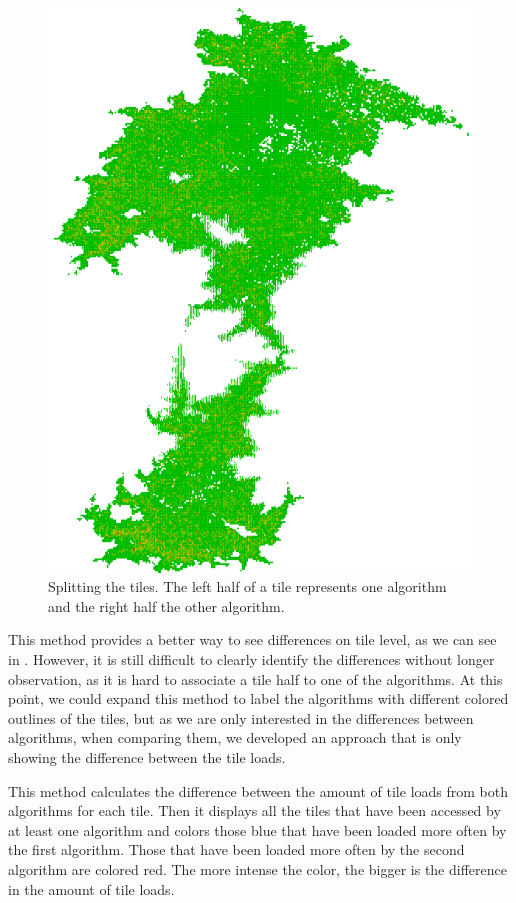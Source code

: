 \documentclass
[
    paper = a4,
    pagesize,
    12 pt,
    oneside,                       %
    open = right,
    DIV = calc,
    BCOR = 0 mm,                   %
    bibtotoc
]
{scrbook}
\begin{document}
\begin{figure}
    \includegraphics[width=\textwidth]{Images/vis-compare-splitted.png}
\caption[]{Splitting the tiles. The left half of a tile represents one algorithm and the right half the other algorithm.}
\label{fig:splitted_tiles}
\end{figure}

This method provides a better way to see differences on tile level, as we can see in .
However, it is still difficult to clearly identify the differences without longer observation, as it is hard to associate a tile half to one of the algorithms.
At this point, we could expand this method to label the algorithms with different colored outlines of the tiles, but as we are only interested in the differences between algorithms, when comparing them, we developed an approach that is only showing the difference between the tile loads.

This method calculates the difference between the amount of tile loads from both algorithms for each tile.
Then it displays all the tiles that have been accessed by at least one algorithm and colors those blue that have been loaded more often by the first algorithm.
Those that have been loaded more often by the second algorithm are colored red.
The more intense the color, the bigger is the difference in the amount of tile loads.
\end{document}
